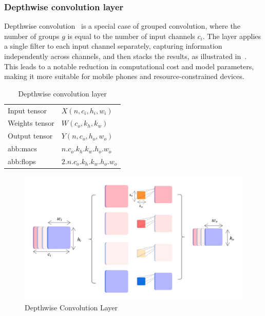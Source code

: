             
        \subsubsection{Depthwise convolution layer}
                
            Depthwise convolution~\cite{mobilenet} is a special case of grouped convolution, where the number of groups $g$ is equal to the number of input channels $c_i$. The layer applies a single filter to each input channel separately, capturing information independently across channels, and then stacks the results, as illustrated in~. This leads to a notable reduction in computational cost and model parameters, making it more suitable for mobile phones and resource-constrained devices.
            
            \begin{table}[hbt!]
            \caption{Depthwise convolution layer}
            \begin{tabularx}{\textwidth}{@{}XX@{}}
            \toprule
              Input tensor &  $X(n, c_i,  h_i, w_i)$\\
              Weights tensor &  $W(c_o, k_h, k_w)$\\
              Output tensor  &  $Y(n, c_o, h_o, w_o)$\\
              \gls{abb:macs}  &  $n.c_o.k_h.k_w.h_o.w_o$\\
              \gls{abb:flops} &  $2.n.c_o.k_h.k_w.h_o.w_o$\\
            \bottomrule
            \end{tabularx}
            \end{table}

              
            \begin{figure}[hbt!]
                \begin{center}
                \includegraphics[width=.9\textwidth]{assets/images/depthwise.png}
                \end{center}
                \caption{Depthwise Convolution Layer}%
                \label{fig:hw-nas:dl:depthwise}
            \end{figure}
            

